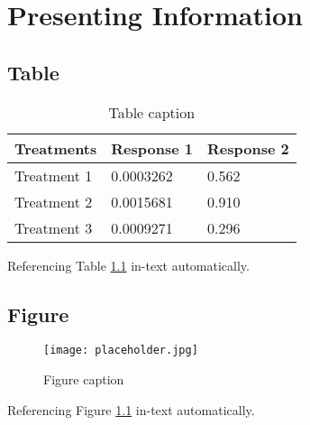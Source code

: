\documentclass[11pt,fleqn,twoside]{book} %
\begin{document}

\chapter{Presenting Information}

\section{Table}

\begin{table}[h]
    \centering
    \begin{tabular}{l l l}
        \toprule
        \textbf{Treatments} & \textbf{Response 1} & \textbf{Response 2} \\
        \midrule
        Treatment 1         & 0.0003262           & 0.562               \\
        Treatment 2         & 0.0015681           & 0.910               \\
        Treatment 3         & 0.0009271           & 0.296               \\
        \bottomrule
    \end{tabular}
    \caption{Table caption}
    \label{tab:example} %
\end{table}

Referencing Table \ref{tab:example} in-text automatically.


\section{Figure}

\begin{figure}[h]
    \centering\texttt{[image: placeholder.jpg]}
    \caption{Figure caption}
    \label{fig:placeholder} %
\end{figure}

Referencing Figure \ref{fig:placeholder} in-text automatically.

\end{document}
